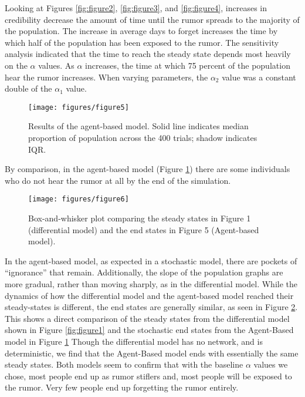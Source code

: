 Looking at Figures \ref{fig:figure2}, \ref{fig:figure3}, and \ref{fig:figure4}, increases in credibility decrease the amount of time until the rumor spreads to the majority of the population.
The increase in average days to forget increases the time by which half of the population has been exposed to the rumor.
The sensitivity analysis indicated that the time to reach the steady state depends most heavily on the $\alpha$ values.
As $ \alpha $ increases, the time at which 75 percent of the population hear the rumor increases.
When varying parameters, the $ \alpha_2 $ value was a constant double of the $ \alpha_1 $ value.

\begin{figure}[H]
\captionsetup{width=0.8\textwidth}
\centering
    \texttt{[image: figures/figure5]}
  \caption{ Results of the agent-based model.
Solid line indicates median proportion of population across the 400 trials; shadow indicates IQR.
}
  \label{fig:figure5}
\end{figure}

By comparison, in the agent-based model (Figure \ref{fig:figure5}) there are some individuals who do not hear the rumor at all by the end of the simulation.

\begin{figure}[H]
\captionsetup{width=0.8\textwidth}
\centering
    \texttt{[image: figures/figure6]}
  \caption{ Box-and-whisker plot comparing the steady states in Figure 1 (differential model) and the end states in Figure 5 (Agent-based model).
}
  \label{fig:figure6}
\end{figure}

In the agent-based model, as expected in a stochastic model, there are pockets of ``ignorance'' that remain.
Additionally, the slope of the population graphs are more gradual, rather than moving sharply, as in the differential model.
While the dynamics of how the differential model and the agent-based model reached their steady-states is  different, the end states are generally similar, as seen in Figure \ref{fig:figure6}.
This shows a direct comparison of the steady states from the differential model shown in Figure \ref{fig:figure1} and the stochastic end states from the Agent-Based model in Figure \ref{fig:figure5}  Though the differential model has no network, and is deterministic, we find that the Agent-Based model ends with essentially the same steady states.
Both models seem to confirm that with the baseline $\alpha$ values we chose, most people end up as rumor stiflers and, most people will be exposed to the rumor.
Very few people end up forgetting the rumor entirely.

